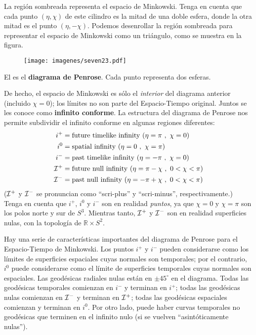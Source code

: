 \documentclass[11pt,b5paper,openany,twoside]{book}
\newcommand{\R}{\mathbb{R}}
\begin{document}
\noindent
La región sombreada representa el espacio de Minkowski.
Tenga en cuenta que cada punto $(\eta,\chi)$ de este cilindro es la mitad de una doble esfera, donde la otra mitad es el punto $(\eta,-\chi)$.
Podemos desenrollar la región sombreada para representar el espacio de Minkowski como un triángulo, como se muestra en la figura.

\begin{figure}[ht]
\centering
\texttt{[image: imagenes/seven23.pdf]}
\end{figure}
El es el {\bf diagrama de Penrose}.
Cada punto representa dos esferas.

De hecho, el espacio de Minkowski es sólo el {\it interior} del diagrama anterior (incluido $\chi=0$); los límites no son parte del Espacio-Tiempo original.
Juntos se les conoce como {\bf infinito conforme}.
La estructura del diagrama de Penrose nos permite subdividir el infinito conforme en algunas regiones diferentes:
\begin{equation*}
\begin{aligned}
i^+  &=  {\rm future~timelike~infinity~} (\eta=\pi\ ,\ \chi=0) \\
i^0  &=  {\rm spatial~infinity~} (\eta=0\ ,\ \chi=\pi) \\
i^-  &=  {\rm past~timelike~infinity~} (\eta=-\pi\ ,\ \chi=0) \\
{\cal I}^+  &=  {\rm future~null~infinity~} (\eta=\pi-\chi\ ,\ 0<\chi<\pi) \\
{\cal I}^-  &=  {\rm past~null~infinity~} (\eta=-\pi+\chi\ ,\ 0<\chi<\pi)
\end{aligned}
\end{equation*}
(${\cal I}^+$ y ${\cal I}^-$ se pronuncian como ``scri-plus'' y ``scri-minus'', respectivamente.)
Tenga en cuenta que $i^+$, $i^0$ y $i^-$ son en realidad {\it puntos}, ya que $\chi=0$ y $\chi=\pi$ son los polos norte y sur de $S^3$.
Mientras tanto, ${\cal I}^+$ y ${\cal I}^-$ son en realidad superficies nulas, con la topología de $\R\times S^2$.

Hay una serie de características importantes del diagrama de Penrose para el Espacio-Tiempo de Minkowski.
Los puntos $i^+$ y $i^-$ pueden considerarse como los límites de superficies espaciales cuyas normales son temporales; por el contrario, $i^0$ puede considerarse como el límite de superficies temporales cuyas normales son espaciales.
Las geodésicas radiales nulas están en $\pm 45^\circ$ en el diagrama.
Todas las geodésicas temporales comienzan en $i^-$ y terminan en $i^+$; todas las geodésicas nulas comienzan en ${\cal I}^-$ y terminan en ${\cal I}^+$; todas las geodésicas espaciales comienzan y terminan en $i^0$.
Por otro lado, puede haber curvas temporales no geodésicas que terminen en el infinito nulo (si se vuelven ``asintóticamente nulas'').
\end{document}
